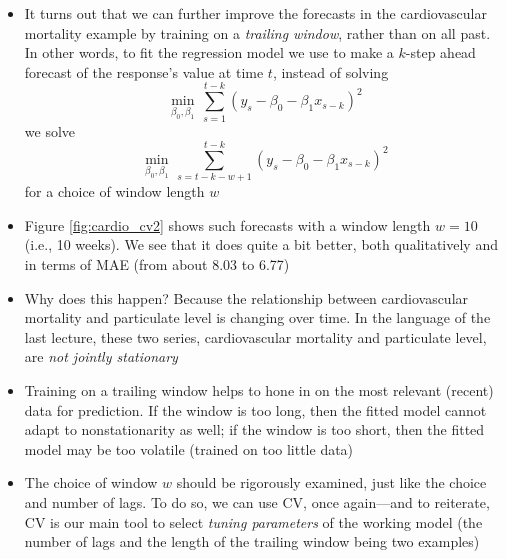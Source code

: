 \documentclass{article}
\begin{document}
\begin{itemize}
\item It turns out that we can further improve the forecasts in the
  cardiovascular mortality example by training on a \emph{trailing window},
  rather than on all past. In other words, to fit the regression model we use to 
  make a $k$-step ahead forecast of the response's value at time $t$, instead of 
  solving    
  \[
  \min_{\beta_0,\beta_1} \, \sum_{s=1}^{t-k} (y_s - \beta_0 - \beta_1 x_{s-k})^2
  \]
  we solve
  \[
  \min_{\beta_0,\beta_1} \, \sum_{s={t-k-w+1}}^{t-k} (y_s - \beta_0 - \beta_1
  x_{s-k})^2 
  \]
  for a choice of window length $w$

\item Figure \ref{fig:cardio_cv2} shows such forecasts with a window length $w = 
  10$ (i.e., 10 weeks). We see that it does quite a bit better, both
  qualitatively and in terms of MAE (from about 8.03 to 6.77) 

\item Why does this happen? Because the relationship between cardiovascular
  mortality and particulate level is changing over time. In the language of the
  last lecture, these two series, cardiovascular mortality and particulate
  level, are \emph{not jointly stationary} 

\item Training on a trailing window helps to hone in on the most relevant
  (recent) data for prediction. If the window is too long, then the fitted model
  cannot adapt to nonstationarity as well; if the window is too short, then the
  fitted model may be too volatile (trained on too little data)

\item The choice of window $w$ should be rigorously examined, just like the 
  choice and number of lags. To do so, we can use CV, once again---and to
  reiterate, CV is our main tool to select \emph{tuning parameters} of the
  working model (the number of lags and the length of the trailing window being
  two examples) 
\end{itemize}
\end{document}
